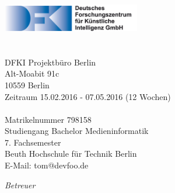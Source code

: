 \begin{titlepage}
	\tgherosfont
	\centering

	{\large \thesisUniversity} \\[4mm]
	\includegraphics[width=6cm]{gfx/DFKI_Schrift_de} \\[2mm]
	\textsf{\thesisUniversityDepartment} \\
	\textsf{\thesisUniversityInstitute} \\[5mm]
    {\normalsize DFKI Projektbüro Berlin}\\
    {\normalsize Alt-Moabit 91c}\\
    {\normalsize 10559 Berlin}\\[5mm]
    {\small{Zeitraum 15.02.2016 - 07.05.2016 (12 Wochen)}}
	\vfill
	{\LARGE \color{ctcolortitle}\textbf{\thesisTitle}}\\[10mm]
	
	{\large \thesisName} \\[5mm]
    {\normalsize Matrikelnummer 798158} \\
	{\normalsize Studiengang Bachelor Medieninformatik} \\
    {\normalsize 7. Fachsemester} \\
    {\normalsize Beuth Hochschule für Technik Berlin} \\[5mm]
	{\small E-Mail: tom@devfoo.de} \\

	\vfill
	\begin{minipage}[t]{.27\textwidth}
		\raggedleft
		\textit{Betreuer}
	\end{minipage}
	\hspace*{15pt}
	\begin{minipage}[t]{.65\textwidth}
		{\large \thesisFirstReviewer} \\
	  	{\small \thesisFirstReviewerDepartment} \\[-1mm]
		{\small \thesisFirstReviewerUniversity}
	\end{minipage} \\[5mm]
	\begin{minipage}[t]{.27\textwidth}
		\raggedleft
		\textit{ }
	\end{minipage}
	\hspace*{15pt}
	\begin{minipage}[t]{.65\textwidth}
		{\large \thesisSecondReviewer} \\
	  	{\small \thesisSecondReviewerDepartment} \\[-1mm]
		{\small \thesisSecondReviewerUniversity}
	\end{minipage} \\[10mm]
	\thesisDate \\
\end{titlepage}